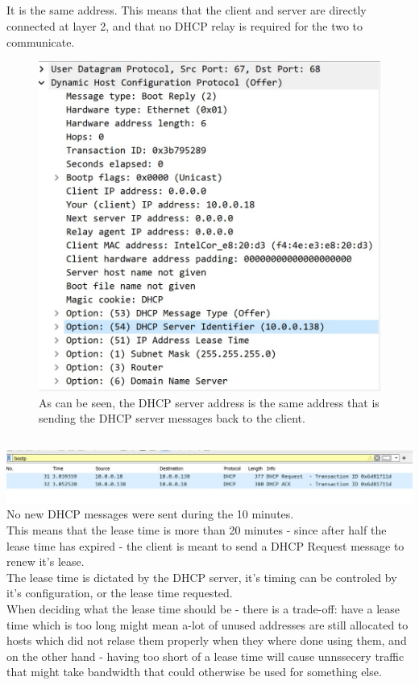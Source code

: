 \subsection{}
It is the same address. This means that the client and server 
are directly connected at layer 2,
and that no DHCP relay is required for the two to communicate.
\begin{figure}
	\includegraphics[width=1.2 \textwidth]{Resources/dhcp_srv.jpeg}
	\caption{As can be seen, the DHCP server address is the same address
	that is sending the DHCP server messages back to the client.}
\end{figure}

\subsection{}
\includegraphics[width=1.2\textwidth]{Resources/dhcp_renew.jpeg}
No new DHCP messages were sent during the 10 minutes.\\
This means that the lease time is more than 20 minutes - since 
after half the lease time has expired - the client is meant to send 
a DHCP Request message to renew it's lease.\\
The lease time is dictated by the DHCP server,
it's timing can be controled by it's configuration, or the lease
time requested.\\
When deciding what the lease time should be - there is a trade-off:
have a lease time which is too long might mean a-lot 
of unused addresses are still allocated to hosts which
did not relase them properly when they where done using them,
and on the other hand - having too short
of a lease time will cause unnssecery traffic that might
take bandwidth that could otherwise be used for something else.

